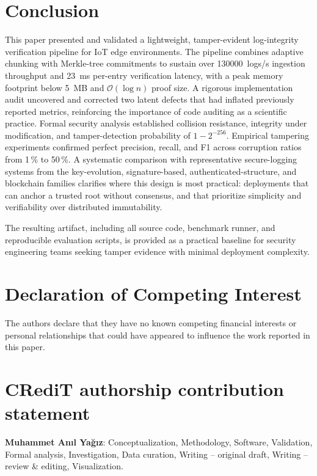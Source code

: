 \documentclass[preprint,12pt]{elsarticle}
\begin{document}
\section{Conclusion}
\label{sec:conclusion}

This paper presented and validated a lightweight, tamper-evident log-integrity verification pipeline for IoT edge environments.
The pipeline combines adaptive chunking with Merkle-tree commitments to sustain over \SI{130000}{logs/s} ingestion throughput and \SI{23}{ms} per-entry verification latency, with a peak memory footprint below \SI{5}{MB} and $\mathcal{O}(\log n)$ proof size.
A rigorous implementation audit uncovered and corrected two latent defects that had inflated previously reported metrics, reinforcing the importance of code auditing as a scientific practice.
Formal security analysis established collision resistance, integrity under modification, and tamper-detection probability of $1 - 2^{-256}$.
Empirical tampering experiments confirmed perfect precision, recall, and F1 across corruption ratios from 1\,\% to 50\,\%.
A systematic comparison with representative secure-logging systems from the key-evolution, signature-based, authenticated-structure, and blockchain families clarifies where this design is most practical: deployments that can anchor a trusted root without consensus, and that prioritize simplicity and verifiability over distributed immutability.

The resulting artifact, including all source code, benchmark runner, and reproducible evaluation scripts, is provided as a practical baseline for security engineering teams seeking tamper evidence with minimal deployment complexity.


\section*{Declaration of Competing Interest}
The authors declare that they have no known competing financial interests or personal relationships that could have appeared to influence the work reported in this paper.

\section*{CRediT authorship contribution statement}
\textbf{Muhammet An\i l Ya\u{g}\i z}: Conceptualization, Methodology, Software, Validation, Formal analysis, Investigation, Data curation, Writing -- original draft, Writing -- review \& editing, Visualization.
\end{document}
